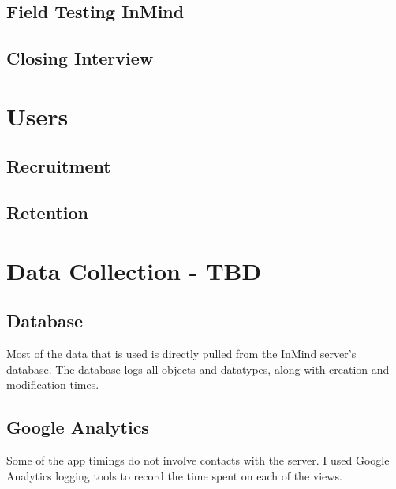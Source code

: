   \subsection{Field Testing InMind}

  \subsection{Closing Interview}

\section{Users}

  \subsection{Recruitment}

  \subsection{Retention}

\section{Data Collection - TBD}
  \subsection{Database}
    Most of the data that is used is directly pulled from
    the InMind server's database.
    The database logs all objects and datatypes,
    along with creation and modification times.

  \subsection{Google Analytics}
    Some of the app timings do not involve contacts with the server.
    I used Google Analytics logging tools to record the time spent
    on each of the views.
